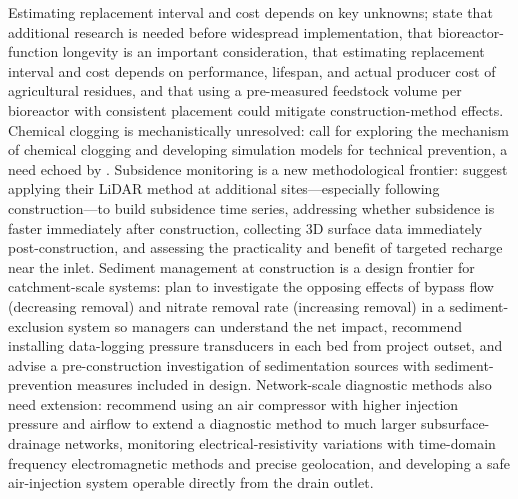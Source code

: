 Estimating replacement interval and cost depends on key unknowns; \textcite{Kohn2023} state that additional research is needed before widespread implementation, that bioreactor-function longevity is an important consideration, that estimating replacement interval and cost depends on performance, lifespan, and actual producer cost of agricultural residues, and that using a pre-measured feedstock volume per bioreactor with consistent placement could mitigate construction-method effects. Chemical clogging is mechanistically unresolved: \textcite{Guo2020} call for exploring the mechanism of chemical clogging and developing simulation models for technical prevention, a need echoed by \textcite{Guo2021}. Subsidence monitoring is a new methodological frontier: \textcite{Christianson2025b} suggest applying their LiDAR method at additional sites---especially following construction---to build subsidence time series, addressing whether subsidence is faster immediately after construction, collecting 3D surface data immediately post-construction, and assessing the practicality and benefit of targeted recharge near the inlet. Sediment management at construction is a design frontier for catchment-scale systems: \textcite{Feyereisen2023} plan to investigate the opposing effects of bypass flow (decreasing removal) and nitrate removal rate (increasing removal) in a sediment-exclusion system so managers can understand the net impact, recommend installing data-logging pressure transducers in each bed from project outset, and advise a pre-construction investigation of sedimentation sources with sediment-prevention measures included in design. Network-scale diagnostic methods also need extension: \textcite{Henine2021} recommend using an air compressor with higher injection pressure and airflow to extend a diagnostic method to much larger subsurface-drainage networks, monitoring electrical-resistivity variations with time-domain frequency electromagnetic methods and precise geolocation, and developing a safe air-injection system operable directly from the drain outlet.


